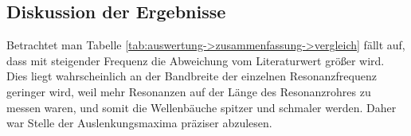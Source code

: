 \subsection{Diskussion der Ergebnisse}
\label{sub:auswertung->Diskussion}
Betrachtet man Tabelle \ref{tab:auswertung->zusammenfassung->vergleich} fällt auf, dass mit steigender Frequenz die Abweichung vom Literaturwert größer wird. Dies liegt wahrscheinlich an der Bandbreite der einzelnen Resonanzfrequenz geringer wird, weil mehr Resonanzen auf der Länge des Resonanzrohres zu messen waren, und somit die Wellenbäuche spitzer und schmaler werden. Daher war Stelle der Auslenkungsmaxima präziser abzulesen. 
